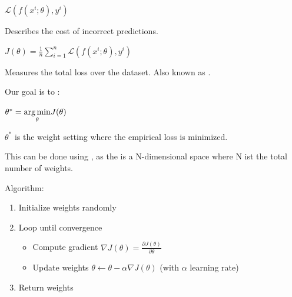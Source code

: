 \documentclass[
../EiKI_Summary.tex,
]
{subfiles}
\begin{document}
\begin{minipage}
    [t]{0.5\textwidth}
    \begin{defbox}
        \begin{csmb*}
            $\mathcal{L}\left(f(x^i; \theta), y^i\right)$ 
        \end{csmb*}
    
        Describes the cost of incorrect predictions.
    \end{defbox}
\end{minipage}
\begin{minipage}
    [t]{0.5\textwidth}
    \begin{defbox}
        \begin{csmb*}
            $J(\theta) = \frac{1}{n} \sum_{i=1}^{n} \mathcal{L}\left(f(x^i; \theta), y^i\right)$
        \end{csmb*}
    
        Measures the total loss over the dataset. Also known as .
    \end{defbox}
\end{minipage}

Our goal is to :

\begin{csmb*}
    $\theta^{\ast} = \underset{\theta}{\arg\min}\space\space J(\theta)$
\end{csmb*}

$\theta^{\ast}$ is the weight setting where the empirical loss is minimized.

This can be done using , as the  is a N-dimensional space where N ist the total number of weights. 

Algorithm:
\begin{enumerate}
    \item Initialize weights randomly
    \item Loop until convergence
    \begin{itemize}
        \item Compute gradient $\displaystyle \nabla J(\theta) = \frac{\partial J(\theta)}{\partial \theta}$
        \item Update weights $\theta \leftarrow \theta - \alpha \nabla J(\theta)$ (with $\alpha$ learning rate)
    \end{itemize}
    \item Return weights
\end{enumerate}
\end{document}
